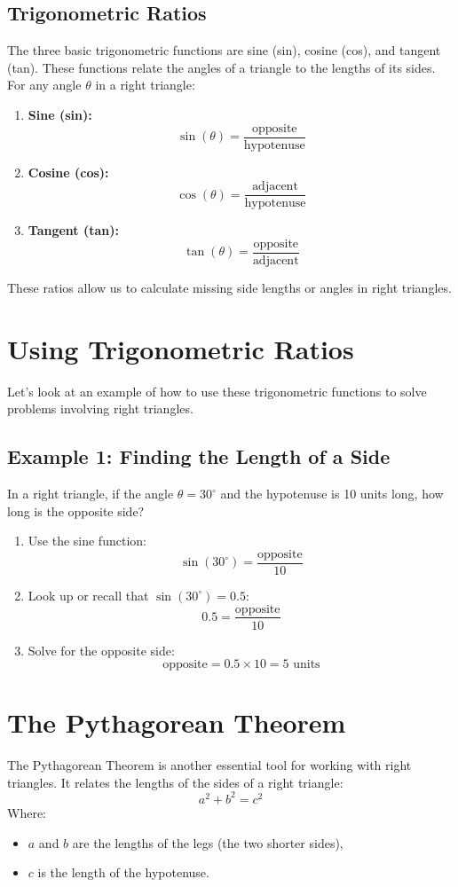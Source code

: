 \subsection{Trigonometric Ratios}
The three basic trigonometric functions are sine (sin), cosine (cos), and tangent (tan). These functions relate the angles of a triangle to the lengths of its sides.
For any angle $\theta$ in a right triangle:
\begin{enumerate}
    \item \textbf{Sine (sin):}
    \[
    \sin(\theta) = \frac{\text{opposite}}{\text{hypotenuse}}
    \]
    \item \textbf{Cosine (cos):}
    \[
    \cos(\theta) = \frac{\text{adjacent}}{\text{hypotenuse}}
    \]
    \item \textbf{Tangent (tan):}
    \[
    \tan(\theta) = \frac{\text{opposite}}{\text{adjacent}}
    \]
\end{enumerate}
These ratios allow us to calculate missing side lengths or angles in right triangles.

\section{Using Trigonometric Ratios}
Let’s look at an example of how to use these trigonometric functions to solve problems involving right triangles.

\subsection{Example 1: Finding the Length of a Side}
In a right triangle, if the angle $\theta = 30^\circ$ and the hypotenuse is 10 units long, how long is the opposite side?
\begin{enumerate}
    \item Use the sine function:
    \[
    \sin(30^\circ) = \frac{\text{opposite}}{10}
    \]
    \item Look up or recall that $\sin(30^\circ) = 0.5$:
    \[
    0.5 = \frac{\text{opposite}}{10}
    \]
    \item Solve for the opposite side:
    \[
    \text{opposite} = 0.5 \times 10 = 5 \text{ units}
    \]
\end{enumerate}

\section{The Pythagorean Theorem}
The Pythagorean Theorem is another essential tool for working with right triangles. It relates the lengths of the sides of a right triangle:
\[
a^2 + b^2 = c^2
\]
Where:
\begin{itemize}
    \item $a$ and $b$ are the lengths of the legs (the two shorter sides),
    \item $c$ is the length of the hypotenuse.
\end{itemize}

